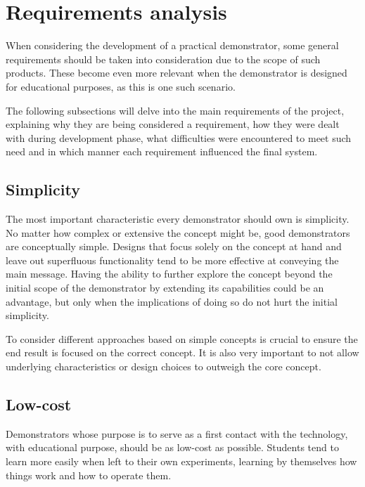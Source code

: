 \section{Requirements analysis} \label{sec:requirements}


When considering the development of a practical demonstrator, some general requirements should be taken into consideration due to the scope of such products.
These become even more relevant when the demonstrator is designed for educational purposes, as this is one such scenario.

The following subsections will delve into the main requirements of the project, explaining why they are being considered a requirement, how they were dealt with during development phase, what difficulties were encountered to meet such need and in which manner each requirement influenced the final system.

\subsection{Simplicity}

The most important characteristic every demonstrator should own is simplicity.
No matter how complex or extensive the concept might be, good demonstrators are conceptually simple.
Designs that focus solely on the concept at hand and leave out superfluous functionality tend to be more effective at conveying the main message.
Having the ability to further explore the concept beyond the initial scope of the demonstrator by extending its capabilities could be an advantage, but only when the implications of doing so do not hurt the initial simplicity.

To consider different approaches based on simple concepts is crucial to ensure the end result is focused on the correct concept.
It is also very important to not allow underlying characteristics or design choices to outweigh the core concept.

\subsection{Low-cost} \label{sec:low-cost}

Demonstrators whose purpose is to serve as a first contact with the technology, with educational purpose, should be as low-cost as possible.
Students tend to learn more easily when left to their own experiments, learning by themselves how things work and how to operate them.

